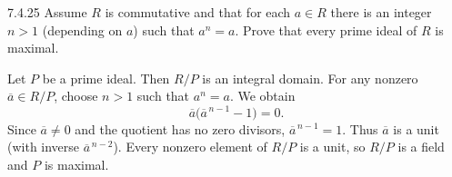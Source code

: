 \documentclass[11pt,oneside]{article}
\begin{document}
\begin{exercise}{7.4.25}
Assume $R$ is commutative and that for each $a\in R$ there is an integer $n>1$ (depending on $a$) such that $a^n=a$. Prove that every prime ideal of $R$ is maximal.
\end{exercise}
\begin{solution}
Let $P$ be a prime ideal. Then $R/P$ is an integral domain. For any nonzero $\overline a\in R/P$, choose $n>1$ such that $a^n=a$. We obtain
\[
\overline a\bigl(\overline a^{\,n-1}-1\bigr)=0.
\]
Since $\overline a\ne0$ and the quotient has no zero divisors, $\overline a^{\,n-1}=1$. Thus $\overline a$ is a unit (with inverse $\overline a^{\,n-2}$). Every nonzero element of $R/P$ is a unit, so $R/P$ is a field and $P$ is maximal.
\end{solution}
\end{document}
